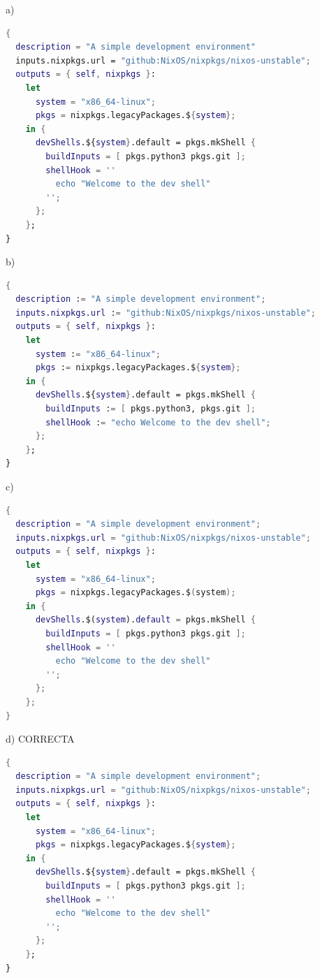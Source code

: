 \begin{opcion}{a)}
\begin{lstlisting}[language=nix]
{
  description = "A simple development environment"
  inputs.nixpkgs.url = "github:NixOS/nixpkgs/nixos-unstable";
  outputs = { self, nixpkgs }:
    let
      system = "x86_64-linux";
      pkgs = nixpkgs.legacyPackages.${system};
    in {
      devShells.${system}.default = pkgs.mkShell {
        buildInputs = [ pkgs.python3 pkgs.git ];
        shellHook = ''
          echo "Welcome to the dev shell"
        '';
      };
    };
}
\end{lstlisting}
\end{opcion}

\begin{opcion}{b)}
\begin{lstlisting}[language=nix]
{
  description := "A simple development environment";
  inputs.nixpkgs.url := "github:NixOS/nixpkgs/nixos-unstable";
  outputs = { self, nixpkgs }:
    let
      system := "x86_64-linux";
      pkgs := nixpkgs.legacyPackages.${system};
    in {
      devShells.${system}.default = pkgs.mkShell {
        buildInputs := [ pkgs.python3, pkgs.git ];
        shellHook := "echo Welcome to the dev shell";
      };
    };
}
\end{lstlisting}
\end{opcion}

\begin{opcion}{c)}
\begin{lstlisting}[language=nix]
{
  description = "A simple development environment";
  inputs.nixpkgs.url = "github:NixOS/nixpkgs/nixos-unstable";
  outputs = { self, nixpkgs }:
    let
      system = "x86_64-linux";
      pkgs = nixpkgs.legacyPackages.$(system);
    in {
      devShells.$(system).default = pkgs.mkShell {
        buildInputs = [ pkgs.python3 pkgs.git ];
        shellHook = ''
          echo "Welcome to the dev shell"
        '';
      };
    };
}
\end{lstlisting}
\end{opcion}

\begin{opcion}{d)}
CORRECTA
\begin{lstlisting}[language=nix]
{
  description = "A simple development environment";
  inputs.nixpkgs.url = "github:NixOS/nixpkgs/nixos-unstable";
  outputs = { self, nixpkgs }:
    let
      system = "x86_64-linux";
      pkgs = nixpkgs.legacyPackages.${system};
    in {
      devShells.${system}.default = pkgs.mkShell {
        buildInputs = [ pkgs.python3 pkgs.git ];
        shellHook = ''
          echo "Welcome to the dev shell"
        '';
      };
    };
}
\end{lstlisting}
\end{opcion}

